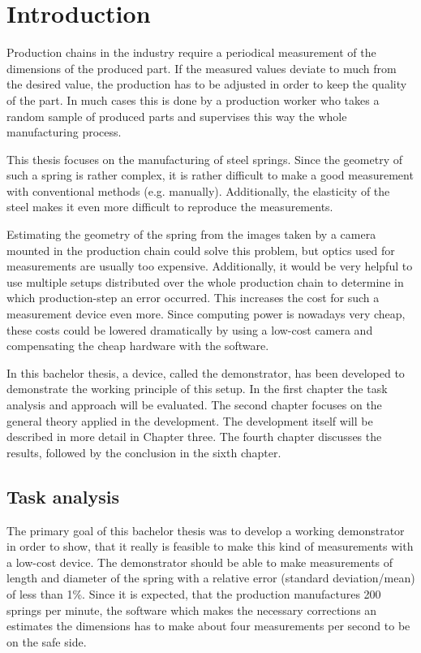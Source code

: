 \chapter{Introduction}
Production chains in the industry require a periodical measurement of the dimensions of the produced part.
If the measured values deviate to much from the desired value, the production has to be adjusted in order to keep the quality of the part.
In much cases this is done by a production worker who takes a random sample of produced parts and supervises this way the whole manufacturing process.

This thesis focuses on the manufacturing of steel springs.
Since the geometry of such a spring is rather complex, it is rather difficult to make a good measurement with conventional methods (e.g. manually).
Additionally, the elasticity of the steel makes it even more difficult to reproduce the measurements.

Estimating the geometry of the spring from the images taken by a camera mounted in the production chain could solve this problem, but optics used for measurements are usually too expensive.
Additionally, it would be very helpful to use multiple setups distributed over the whole production chain to determine in which production-step an error occurred.
This increases the cost for such a measurement device even more.
Since computing power is nowadays very cheap, these costs could be lowered dramatically by using a low-cost camera and compensating the cheap hardware with the software.

In this bachelor thesis, a device, called the demonstrator, has been developed to demonstrate the working principle of this setup.
In the first chapter the task analysis and approach will be evaluated.
The second chapter focuses on the general theory applied in the development.
The development itself will be described in more detail in Chapter three.
The fourth chapter discusses the results, followed by the conclusion in the sixth chapter. 

\section{Task analysis}
The primary goal of this bachelor thesis was to develop a working demonstrator in order to show, that it really is feasible to make this kind of measurements with a low-cost device.
The demonstrator should be able to make measurements of length and diameter of the spring with a relative error (standard deviation/mean) of less than 1\%.
Since it is expected, that the production manufactures 200 springs per minute, the software which makes the necessary corrections an estimates the dimensions has to make about four measurements per second to be on the safe side.

